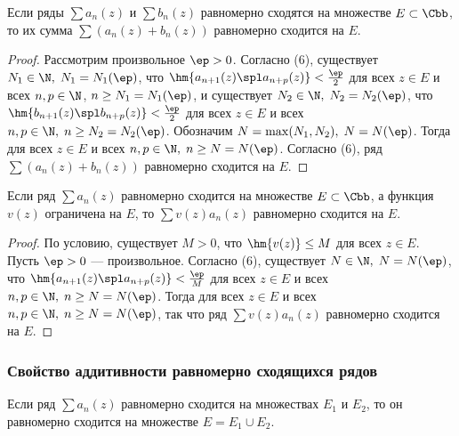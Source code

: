 \documentclass[a4paper]{article}
\begin{document}
\begin{theorem}
Если ряды $\sum a_n(z)$ и $\sum b_n(z)$ равномерно сходятся на
множестве $E\subset\Cbb$, то их сумма $\sum(a_n(z)+b_n(z))$
равномерно сходится на $E$.
\end{theorem}

\begin{proof}
Рассмотрим произвольное $\ep>0$. Согласно (6), существует $N_1\in\N,
\; N_1=N_1(\ep)$, что $\hm{a_{n+1}(z) \spl a_{n+p}(z)} <
\frac{\ep}2$ для всех $z\in E$ и всех $n,p\in\N$, $n\ge
N_1=N_1(\ep)$, и существует $N_2\in\N, \; N_2=N_2(\ep)$, что
$\hm{b_{n+1}(z) \spl b_{n+p}(z)} < \frac{\ep}2$ для всех $z\in E$ и
всех $n,p\in\N, \; n\ge N_2=N_2(\ep)$. Обозначим $N=\max(N_1,N_2),
\; N=N(\ep)$. Тогда  для всех $z\in
E$ и всех $n,p\in\N, \; n\ge N=N(\ep)$. Согласно (6), ряд $\sum
(a_n(z)+b_n(z))$ равномерно сходится на $E$.
\end{proof}

\begin{theorem}
Если ряд $\sum a_n(z)$ равномерно сходится на множестве
$E\subset\Cbb$, а функция $v(z)$ ограничена на $E$, то $\sum
v(z)a_n(z)$ равномерно сходится на $E$.
\end{theorem}

\begin{proof}
По условию, существует $M>0$, что $\hm{v(z)}\le M$ для всех $z\in
E$. Пусть $\ep>0$ --- произвольное. Согласно (6), существует
$N\in\N, \; N=N(\ep)$, что $\hm{a_{n+1}(z) \spl a_{n+p}(z)} <
\frac{\ep}M$ для всех $z\in E$ и всех $n,p\in\N, \; n\ge N=N(\ep)$.
Тогда  для всех $z\in E$ и всех $n,p\in\N, \; n\ge
N=N(\ep)$, так что ряд $\sum v(z) a_n(z)$ равномерно сходится на
$E$.
\end{proof}

\subsubsection{Свойство аддитивности равномерно сходящихся рядов}
\begin{theorem}
Если ряд $\sum a_n(z)$ равномерно сходится на множествах $E_1$ и
$E_2$, то он равномерно сходится на множестве $E=E_1\cup E_2$.
\end{theorem}
\end{document}
